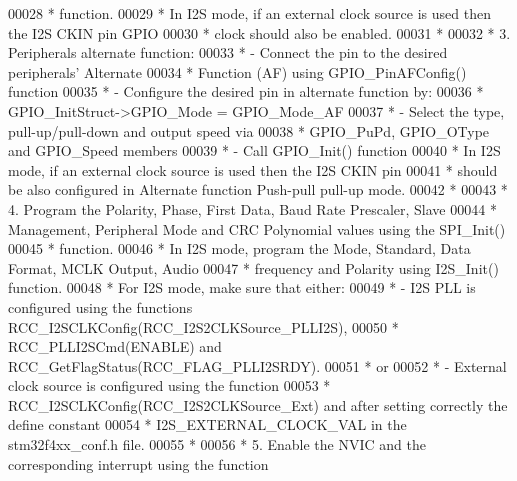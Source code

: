 \begin{DoxyCode}
00028 \textcolor{comment}{  *             function.}
00029 \textcolor{comment}{  *             In I2S mode, if an external clock source is used then the I2S CKIN pin GPIO}
00030 \textcolor{comment}{  *             clock should also be enabled.}
00031 \textcolor{comment}{  *}
00032 \textcolor{comment}{  *          3. Peripherals alternate function: }
00033 \textcolor{comment}{  *                 - Connect the pin to the desired peripherals' Alternate }
00034 \textcolor{comment}{  *                   Function (AF) using GPIO\_PinAFConfig() function}
00035 \textcolor{comment}{  *                 - Configure the desired pin in alternate function by:}
00036 \textcolor{comment}{  *                   GPIO\_InitStruct->GPIO\_Mode = GPIO\_Mode\_AF}
00037 \textcolor{comment}{  *                 - Select the type, pull-up/pull-down and output speed via }
00038 \textcolor{comment}{  *                   GPIO\_PuPd, GPIO\_OType and GPIO\_Speed members}
00039 \textcolor{comment}{  *                 - Call GPIO\_Init() function}
00040 \textcolor{comment}{  *              In I2S mode, if an external clock source is used then the I2S CKIN pin}
00041 \textcolor{comment}{  *              should be also configured in Alternate function Push-pull pull-up mode. }
00042 \textcolor{comment}{  *        }
00043 \textcolor{comment}{  *          4. Program the Polarity, Phase, First Data, Baud Rate Prescaler, Slave }
00044 \textcolor{comment}{  *             Management, Peripheral Mode and CRC Polynomial values using the SPI\_Init()}
00045 \textcolor{comment}{  *             function.}
00046 \textcolor{comment}{  *             In I2S mode, program the Mode, Standard, Data Format, MCLK Output, Audio }
00047 \textcolor{comment}{  *             frequency and Polarity using I2S\_Init() function.}
00048 \textcolor{comment}{  *             For I2S mode, make sure that either:}
00049 \textcolor{comment}{  *              - I2S PLL is configured using the functions
       RCC\_I2SCLKConfig(RCC\_I2S2CLKSource\_PLLI2S), }
00050 \textcolor{comment}{  *                RCC\_PLLI2SCmd(ENABLE) and RCC\_GetFlagStatus(RCC\_FLAG\_PLLI2SRDY).}
00051 \textcolor{comment}{  *              or }
00052 \textcolor{comment}{  *              - External clock source is configured using the function }
00053 \textcolor{comment}{  *                RCC\_I2SCLKConfig(RCC\_I2S2CLKSource\_Ext) and after setting correctly the define
       constant}
00054 \textcolor{comment}{  *                I2S\_EXTERNAL\_CLOCK\_VAL in the stm32f4xx\_conf.h file. }
00055 \textcolor{comment}{  *}
00056 \textcolor{comment}{  *          5. Enable the NVIC and the corresponding interrupt using the function }

\end{DoxyCode}

